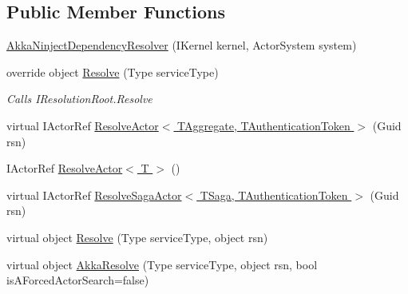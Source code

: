 \subsection*{Public Member Functions}
\begin{DoxyCompactItemize}
\item 
\hyperlink{classCqrs_1_1Ninject_1_1Akka_1_1AkkaNinjectDependencyResolver_a7fdff6e54ac903d86bb79bf5536f8820_a7fdff6e54ac903d86bb79bf5536f8820}{Akka\+Ninject\+Dependency\+Resolver} (I\+Kernel kernel, Actor\+System system)
\item 
override object \hyperlink{classCqrs_1_1Ninject_1_1Akka_1_1AkkaNinjectDependencyResolver_adace29de71f10e34e952bd41e48106a6_adace29de71f10e34e952bd41e48106a6}{Resolve} (Type service\+Type)
\begin{DoxyCompactList}\small\item\em Calls I\+Resolution\+Root.\+Resolve \end{DoxyCompactList}\item 
virtual I\+Actor\+Ref \hyperlink{classCqrs_1_1Ninject_1_1Akka_1_1AkkaNinjectDependencyResolver_ab5ba20875aab8764bbb7d6df61722436_ab5ba20875aab8764bbb7d6df61722436}{Resolve\+Actor$<$ T\+Aggregate, T\+Authentication\+Token $>$} (Guid rsn)
\item 
I\+Actor\+Ref \hyperlink{classCqrs_1_1Ninject_1_1Akka_1_1AkkaNinjectDependencyResolver_a6c3399c949a77457456d77688eb66054_a6c3399c949a77457456d77688eb66054}{Resolve\+Actor$<$ T $>$} ()
\item 
virtual I\+Actor\+Ref \hyperlink{classCqrs_1_1Ninject_1_1Akka_1_1AkkaNinjectDependencyResolver_a56da352a605155a1d6572ddb76d9ceea_a56da352a605155a1d6572ddb76d9ceea}{Resolve\+Saga\+Actor$<$ T\+Saga, T\+Authentication\+Token $>$} (Guid rsn)
\item 
virtual object \hyperlink{classCqrs_1_1Ninject_1_1Akka_1_1AkkaNinjectDependencyResolver_ab860d9bcf44b62098a8df91bbcb5013d_ab860d9bcf44b62098a8df91bbcb5013d}{Resolve} (Type service\+Type, object rsn)
\item 
virtual object \hyperlink{classCqrs_1_1Ninject_1_1Akka_1_1AkkaNinjectDependencyResolver_a8e55618bf89a2c14bc3d0e7b3253f17d_a8e55618bf89a2c14bc3d0e7b3253f17d}{Akka\+Resolve} (Type service\+Type, object rsn, bool is\+A\+Forced\+Actor\+Search=false)
\end{DoxyCompactItemize}
